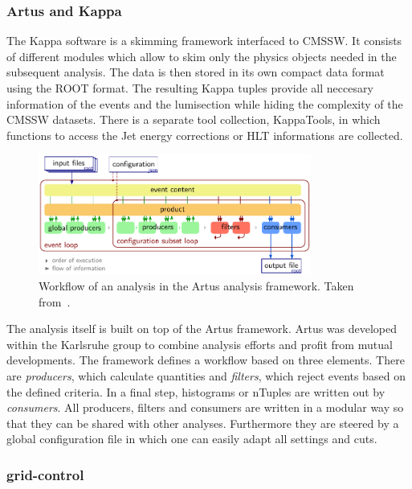 \subsubsection{Artus and Kappa}
\label{artus_kappa}

The Kappa software is a skimming framework interfaced to CMSSW. It consists of
different modules which allow to skim only the physics objects needed in the
subsequent analysis. The data is then stored in its own compact data format
using the ROOT format. The resulting Kappa tuples provide all neccesary
information of the events and the lumisection while hiding the complexity of the
CMSSW datasets. There is a separate tool collection, KappaTools, in which
functions to access the Jet energy corrections or HLT informations are
collected.

\begin{figure}[htp]
    \centering
    \includegraphics[width=0.8\textwidth]{figures/cms_detector/artus_workflow.pdf}
    \caption[Workflow of an analysis in the Artus framework]{Workflow of an
        analysis in the Artus analysis framework. Taken
        from~\cite{Berger:2014aca}.}
    \label{fig:lhc_tier_structure}
\end{figure}

The analysis itself is built on top of the Artus framework. Artus was developed
within the Karlsruhe group to combine analysis efforts and profit from mutual
developments. The framework defines a workflow based on three elements. There
are \emph{producers}, which calculate quantities and \emph{filters}, which
reject events based on the defined criteria. In a final step, histograms or
nTuples are written out by \emph{consumers}. All producers, filters and
consumers are written in a modular way so that they can be shared with other
analyses. Furthermore they are steered by a global configuration file in which
one can easily adapt all settings and cuts.

\subsubsection{grid-control}


